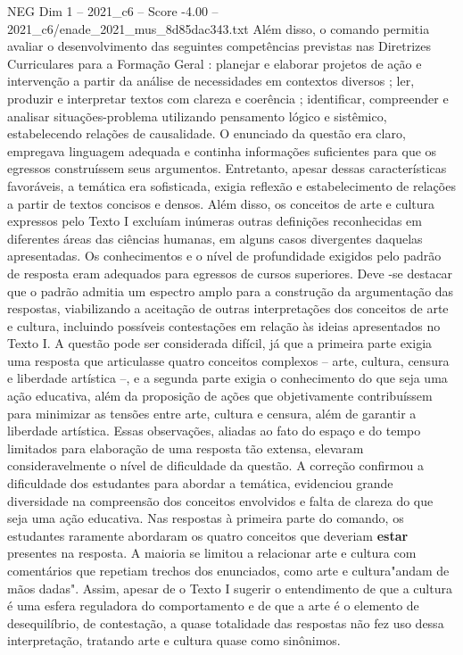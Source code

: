 \begin{textsample}{NEG Dim 1 – 2021\_c6 – Score -4.00 – 2021\_c6/enade\_2021\_mus\_8d85dac343.txt}
Além disso, o comando permitia avaliar o desenvolvimento das seguintes competências previstas nas Diretrizes Curriculares para a Formação Geral : planejar e elaborar projetos de ação e intervenção a partir da análise de necessidades em contextos diversos ; ler, produzir e interpretar textos com clareza e coerência ; identificar, compreender e analisar situações-problema utilizando pensamento lógico e sistêmico, estabelecendo relações de causalidade.
O enunciado da questão era claro, empregava linguagem adequada e continha informações suficientes para que os egressos construíssem seus argumentos.
Entretanto, apesar dessas características favoráveis, a temática era sofisticada, exigia reflexão e estabelecimento de relações a partir de textos concisos e densos.
Além disso, os conceitos de arte e cultura expressos pelo Texto I excluíam inúmeras outras definições reconhecidas em diferentes áreas das ciências humanas, em alguns casos divergentes daquelas apresentadas.
Os conhecimentos e o nível de profundidade exigidos pelo padrão de resposta eram adequados para egressos de cursos superiores.
Deve -se destacar que o padrão admitia um espectro amplo para a construção da argumentação das respostas, viabilizando a aceitação de outras interpretações dos conceitos de arte e cultura, incluindo possíveis contestações em relação às ideias apresentados no Texto I.
A questão pode ser considerada difícil, já que a primeira parte exigia uma resposta que articulasse quatro conceitos complexos – arte, cultura, censura e liberdade artística –, e a segunda parte exigia o conhecimento do que seja uma ação educativa, além da proposição de ações que objetivamente contribuíssem para minimizar as tensões entre arte, cultura e censura, além de garantir a liberdade artística.
Essas observações, aliadas ao fato do espaço e do tempo limitados para elaboração de uma resposta tão extensa, elevaram consideravelmente o nível de dificuldade da questão.
A correção confirmou a dificuldade dos estudantes para abordar a temática, evidenciou grande diversidade na compreensão dos conceitos envolvidos e falta de clareza do que seja uma ação educativa.
Nas respostas à primeira parte do comando, os estudantes raramente abordaram os quatro conceitos que deveriam \textbf{estar} presentes na resposta.
A maioria se limitou a relacionar arte e cultura com comentários que repetiam trechos dos enunciados, como arte e cultura"andam de mãos dadas".
Assim, apesar de o Texto I sugerir o entendimento de que a cultura é uma esfera reguladora do comportamento e de que a arte é o elemento de desequilíbrio, de contestação, a quase totalidade das respostas não fez uso dessa interpretação, tratando arte e cultura quase como sinônimos.

\end{textsample}
